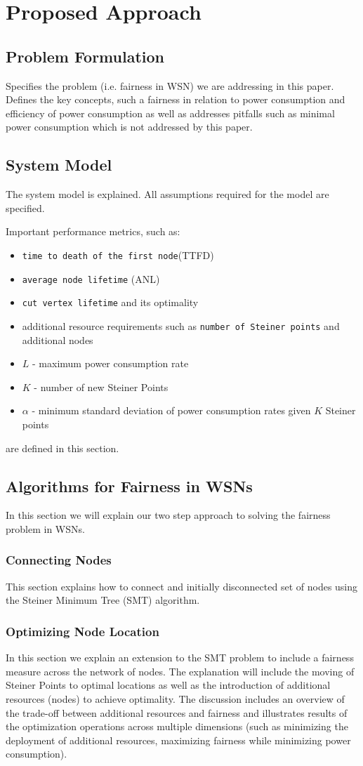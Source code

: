 \section{Proposed Approach}\label{approach}

\subsection{Problem Formulation}
Specifies the problem (i.e. fairness in WSN) we are addressing in this paper. Defines the key concepts, such a fairness in relation to power consumption and efficiency of power consumption as well as addresses pitfalls such as minimal power consumption which is not addressed by this paper.
\subsection{System Model}
The system model is explained. All assumptions required for the model are specified.

Important performance metrics, such as:
\begin{itemize}
\item \texttt{time to death of the first node}(TTFD)
\item \texttt{average node lifetime} (ANL)
\item \texttt{cut vertex lifetime} and its optimality
\item additional resource requirements such as \texttt{number of Steiner points} and additional nodes
\item $L$ - maximum power consumption rate
\item $K$ - number of new Steiner Points
\item $\alpha$ - minimum standard deviation of power consumption rates given $K$ Steiner points
\end{itemize}
are defined in this section.


\subsection{Algorithms for Fairness in WSNs}
In this section we will explain our two step approach to solving the fairness problem in WSNs.
\subsubsection{Connecting Nodes}
This section explains how to connect and initially disconnected set of nodes using the Steiner Minimum Tree (SMT) algorithm.
\subsubsection{Optimizing Node Location}
In this section we explain an extension to the SMT problem to include a fairness measure across the network of nodes.
The explanation will include the moving of Steiner Points to optimal locations as well as the introduction of additional resources (nodes) to achieve optimality. The discussion includes an overview of the trade-off between additional resources and  fairness and illustrates results of the optimization operations across multiple dimensions (such as minimizing the deployment of additional resources, maximizing fairness while minimizing power consumption).